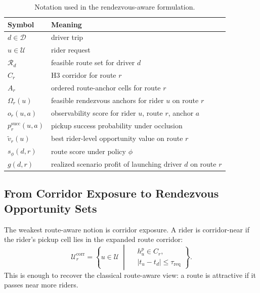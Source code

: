 \documentclass[journal]{IEEEtran}
\begin{document}
\begin{table}[!t]
\caption{Notation used in the rendezvous-aware formulation.}
\label{tab:notation}
\centering
\footnotesize
\begin{tabularx}{\columnwidth}{|L{0.24\columnwidth}|L{0.68\columnwidth}|}
\hline
{}\textbf{Symbol} & \textbf{Meaning} \\
\hline
$d \in \mathcal{D}$ & driver trip \\
\hline
$u \in \mathcal{U}$ & rider request \\
\hline
$\mathcal{R}_d$ & feasible route set for driver $d$ \\
\hline
$C_r$ & H3 corridor for route $r$ \\
\hline
$A_r$ & ordered route-anchor cells for route $r$ \\
\hline
$\Omega_r(u)$ & feasible rendezvous anchors for rider $u$ on route $r$ \\
\hline
$o_r(u,a)$ & observability score for rider $u$, route $r$, anchor $a$ \\
\hline
$p_r^{\mathrm{succ}}(u,a)$ & pickup success probability under occlusion \\
\hline
$\tilde v_r(u)$ & best rider-level opportunity value on route $r$ \\
\hline
$s_\phi(d,r)$ & route score under policy $\phi$ \\
\hline
$g(d,r)$ & realized scenario profit of launching driver $d$ on route $r$ \\
\hline
\end{tabularx}
\end{table}

\subsection{From Corridor Exposure to Rendezvous Opportunity Sets}
The weakest route-aware notion is corridor exposure. A rider is corridor-near if the rider's pickup cell lies in the expanded route corridor:
\begin{equation}
\mathcal{U}_r^{\mathrm{corr}} =
\left\{u \in \mathcal{U} \;\middle|\;
\begin{aligned}
&h_u^p \in C_r,\\
&|t_u - t_d| \le \tau_{\mathrm{req}}
\end{aligned}
\right\}.
\end{equation}
This is enough to recover the classical route-aware view: a route is attractive if it passes near more riders.
\end{document}

